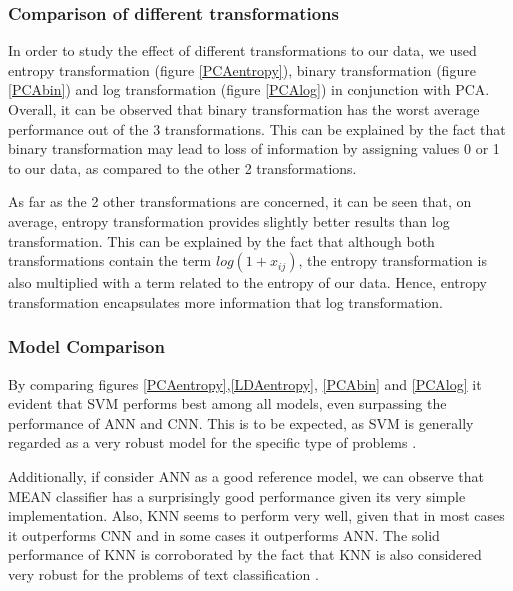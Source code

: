 \documentclass[10pt,journal,compsoc]{IEEEtran}
\begin{document}
\subsubsection{Comparison of different transformations}
In order to study the effect of different transformations
to our data, we used entropy transformation (figure \ref{PCAentropy}), 
binary transformation (figure \ref{PCAbin}) and
log transformation (figure \ref{PCAlog}) in conjunction with PCA.
Overall, it can be observed that binary transformation has the
worst average performance out of the 3 transformations.
This can be explained by the fact that binary transformation
may lead to loss of information by assigning values 0 or 1
to our data, as compared to the other 2 transformations.

As far as the 2 other transformations are concerned,
it can be seen that, on average, entropy transformation
provides slightly better results than log transformation.
This can be explained by the fact that although both 
transformations contain the term $log(1+x_{ij})$, 
the entropy transformation is also multiplied with
a term related to the entropy of our data.
Hence, entropy transformation encapsulates more
information that log transformation.

\subsubsection{Model Comparison}
By comparing figures \ref{PCAentropy},\ref{LDAentropy},
\ref{PCAbin} and \ref{PCAlog} it evident that
SVM performs best among all models, even
surpassing the performance of ANN and CNN.
This is to be expected, as SVM is generally regarded
as a very robust model for the specific type of problems 
\cite{a3}.

Additionally, if consider ANN as a good reference model,
we can observe that MEAN classifier has a surprisingly 
good performance given its very simple implementation.
Also, KNN seems to perform very well, given that in most
cases it outperforms CNN and in some cases it outperforms
ANN.
The solid performance of KNN is corroborated by the fact
that KNN is also considered very robust for the problems
of text classification \cite{a3}.
\end{document}
